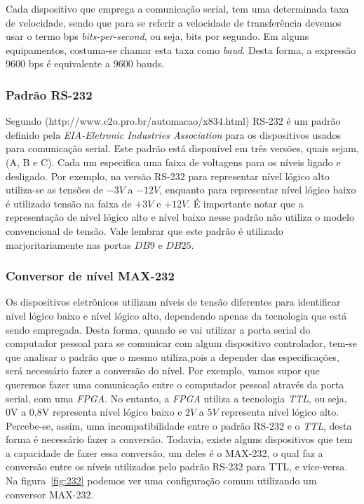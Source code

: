 \documentclass[12pt]{article}
\begin{document}
Cada dispositivo que emprega a comunicação serial, tem uma determinada taxa de velocidade, sendo que para se referir a velocidade de transferência devemos usar o termo bps \textit{bits-per-second}, ou seja, bits por segundo. Em alguns equipamentos, costuma-se chamar esta taxa  como \textit{baud}. Desta forma, a expressão 9600 bps é equivalente a 9600 bauds.

\subsubsection{Padrão RS-232}
Segundo (http://www.c2o.pro.br/automacao/x834.html) RS-232 é um padrão definido pela \textit{EIA-Eletronic Industries Association} para os dispositivos usados para comunicação serial. Este padrão está disponível em três versões, quais sejam, (A, B e C). Cada um especifica uma faixa de voltagens para os níveis ligado e desligado. Por exemplo, na versão RS-232 para representar  nível lógico alto utiliza-se as tensões de $-3V$ a $-12V$, enquanto para representar nível lógico baixo é utilizado tensão na faixa de $+3V$ e $+12V$. É importante notar que a representação de nível lógico alto e nível baixo nesse padrão não utiliza o modelo convencional de tensão. Vale lembrar que este padrão é utilizado marjoritariamente nas portas $DB9$ e $DB25$.  

\subsubsection{Conversor de nível MAX-232}
Os dispositivos eletrônicos utilizam níveis de tensão diferentes para identificar nível lógico baixo e nível lógico alto, dependendo apenas da tecnologia que está sendo empregada. Desta forma, quando se vai utilizar a porta serial do computador pessoal para se comunicar com algum dispositivo controlador, tem-se que analisar o padrão que o mesmo utiliza,pois a depender das especificações, será necessário fazer a conversão do nível. Por exemplo, vamos supor que queremos fazer uma comunicação entre o computador pessoal através da porta serial, com uma \textit{FPGA}. No entanto, a \textit{FPGA} utiliza a tecnologia \textit{TTL}, ou seja, 0V a 0,8V representa nível lógico baixo e $2V$ a $5V$ representa nível lógico alto. Percebe-se, assim, uma incompatibilidade entre o padrão RS-232 e o \textit{TTL}, desta forma é necessário fazer a conversão. Todavia, existe alguns dispositivos que tem a capacidade de fazer essa conversão, um deles é o MAX-232, o qual faz  a conversão entre os níveis utilizados pelo padrão RS-232 para TTL, e vice-versa. Na figura~\ref{fig:232} podemos ver uma configuração comum utilizando um conversor MAX-232. 
\end{document}
